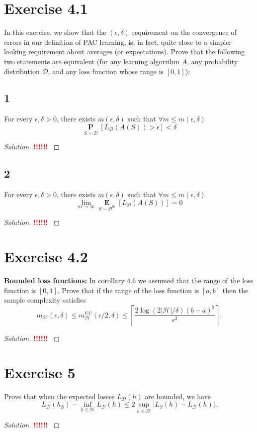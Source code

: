 \documentclass[10pt, a4paper, twoside]{amsart}
\renewcommand{\P}{\operatorname*{\ensuremath{\mathbf{P}}}}
\newcommand{\Ev}{\operatorname*{\ensuremath{\mathbf{E}}}}
\newenvironment{solution}
               {\let\oldqedsymbol=\qedsymbol
                \renewcommand{\qedsymbol}{$\blacktriangleleft$}
                \begin{proof}[Solution]}
               {\end{proof}
                \renewcommand{\qedsymbol}{\oldqedsymbol}}
\newcommand{\TODO}{\textcolor{red}{\textbf{!!!!!! }}}
\begin{document}
\section*{Exercise 4.1}
In this exercise, we show that the $(\epsilon , \delta )$ requirement on the convergence of errors in our definition of PAC learning, is, in fact, quite close to a simpler looking requirement about averages (or expectations). Prove that the following two statements are equivalent (for any learning algorithm $A$, any probability distribution $\mathcal{D}$, and any loss function whose range is $[0,1]$):
\subsection*{1}
For every $\epsilon , \delta > 0$, there exists $m(\epsilon , \delta)$ such that $\forall m \leq m(\epsilon , \delta)$
\begin{equation*}
\P_{S \sim \mathcal{D}}[L_{\mathcal{D}}(A(S))>\epsilon]<\delta
\end{equation*}
\begin{solution}
  \TODO
\end{solution}

\subsection*{2}
For every $\epsilon , \delta > 0$, there exists $m(\epsilon , \delta)$ such that $\forall m \leq m(\epsilon , \delta)$
\begin{equation*}
\lim_{m\to \infty}\Ev_{S\sim \mathcal{D}^{m}}[L_{\mathcal{D}}(A(S))] =0
\end{equation*}
\begin{solution}
  \TODO
\end{solution}

\section*{Exercise 4.2}
\textbf{Bounded loss functions:}
In corollary 4.6 we assumed that the range of the loss function is $[0,1]$. Prove that if the range of the loss function is $[a,b]$ then the sample complexity satisfies
\begin{equation*}
  m_{\mathcal{H}}(\epsilon , \delta) \leq m_{\mathcal{H}}^{\text{UC}}(\epsilon /2, \delta)
  \leq \left\lceil \frac{2\log (2|\mathcal{H}|/\delta) (b-a)^2}{\epsilon^2} \right\rceil .
\end{equation*}
\begin{solution}
  \TODO
\end{solution}

\section*{Exercise 5}
Prove that when the expected losses $L_{\mathcal{D}}(h)$ are bounded, we have
\begin{equation*}
  L_{\mathcal{D}}(h_S) - \inf_{h\in \mathcal{H}}L_{\mathcal{D}}(h)
  \leq 2 \sup_{h\in \mathcal{H}}|L_S(h)-L_{\mathcal{D}}(h)|.
\end{equation*}
\begin{solution}
    \TODO
\end{solution}
\end{document}
